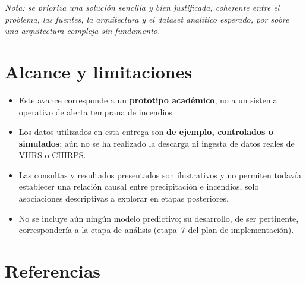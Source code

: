 \documentclass[11pt,a4paper]{article}
\begin{document}
\vspace{0.3cm}
\noindent\textit{Nota: se prioriza una soluci\'on sencilla y bien justificada, coherente entre el problema, las fuentes, la arquitectura y el dataset anal\'itico esperado, por sobre una arquitectura compleja sin fundamento.}

\section{Alcance y limitaciones}
\label{sec:alcance}

\begin{itemize}
    \item Este avance corresponde a un \textbf{prototipo acad\'emico}, no a un sistema operativo de alerta temprana de incendios.
    \item Los datos utilizados en esta entrega son \textbf{de ejemplo, controlados o simulados}; a\'un no se ha realizado la descarga ni ingesta de datos reales de VIIRS o CHIRPS.
    \item Las consultas y resultados presentados son ilustrativos y no permiten todav\'ia establecer una relaci\'on causal entre precipitaci\'on e incendios, solo asociaciones descriptivas a explorar en etapas posteriores.
    \item No se incluye a\'un ning\'un modelo predictivo; su desarrollo, de ser pertinente, corresponder\'ia a la etapa de an\'alisis (etapa~7 del plan de implementaci\'on).
\end{itemize}

\section{Referencias}
\end{document}
